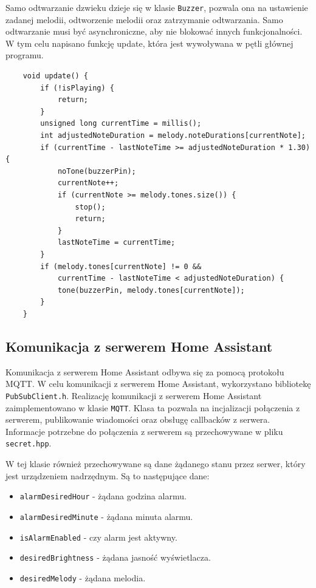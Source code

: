 \documentclass[../main.tex]{subfiles}
\begin{document}
Samo odtwarzanie dzwieku dzieje się w klasie \texttt{Buzzer}, pozwala ona na ustawienie zadanej melodii, odtworzenie melodii oraz zatrzymanie odtwarzania.
Samo odtwarzanie musi być asynchroniczne, aby nie blokować innych funkcjonalności. 
W tym celu napisano funkcję update, która jest wywoływana w pętli głównej programu.

\begin{verbatim}
    void update() {
        if (!isPlaying) {
            return;
        }
        unsigned long currentTime = millis();
        int adjustedNoteDuration = melody.noteDurations[currentNote];
        if (currentTime - lastNoteTime >= adjustedNoteDuration * 1.30) {
            noTone(buzzerPin);
            currentNote++;
            if (currentNote >= melody.tones.size()) {
                stop();
                return;
            }
            lastNoteTime = currentTime;
        }
        if (melody.tones[currentNote] != 0 &&
            currentTime - lastNoteTime < adjustedNoteDuration) {
            tone(buzzerPin, melody.tones[currentNote]);
        }
    }
\end{verbatim}

\subsection{Komunikacja z serwerem Home Assistant}
Komunikacja z serwerem Home Assistant odbywa się za pomocą protokołu MQTT. W celu komunikacji z serwerem Home Assistant, wykorzystano bibliotekę \texttt{PubSubClient.h}.
Realizację komunikacji z serwerem Home Assistant zaimplementowano w klasie \texttt{MQTT}. Klasa ta pozwala na incjalizacji połączenia z serwerem, 
publikowanie wiadomości oraz obsługę callbacków z serwera. Informacje potrzebne do połączenia z serwerem są przechowywane w pliku \texttt{secret.hpp}.

W tej klasie również przechowywane są dane żądanego stanu przez serwer, który jest urządzeniem nadrzędnym. Są to następujące dane:
\begin{itemize}
  \item \texttt{alarmDesiredHour} - żądana godzina alarmu.
  \item \texttt{alarmDesiredMinute} - żądana minuta alarmu.
  \item \texttt{isAlarmEnabled} - czy alarm jest aktywny.
  \item \texttt{desiredBrightness} - żądana jasność wyświetlacza.
  \item \texttt{desiredMelody} - żądana melodia.
\end{itemize}
\end{document}
